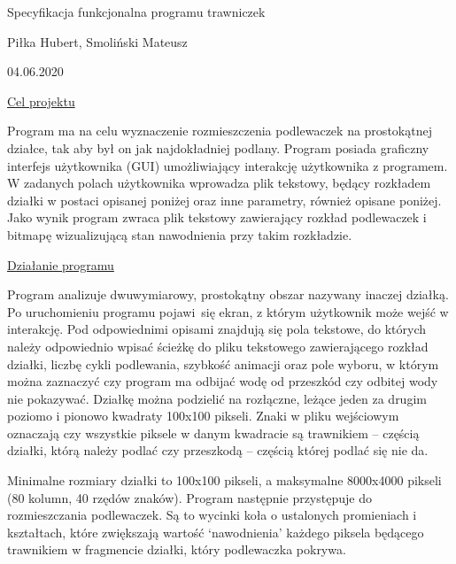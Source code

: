 \documentclass[12pt]{article}
\renewcommand{\_}{\kern-1.5pt\textunderscore\kern-1.5pt}
\begin{document}
\begin{Center}
Specyfikacja funkcjonalna programu trawniczek
\end{Center}\par

\begin{Center}
Piłka Hubert, Smoliński Mateusz
\end{Center}\par

\begin{Center}
04.06.2020
\end{Center}\par

{\fontsize{16pt}{19.2pt}\selectfont \uline{Cel projektu}\par}\par

Program ma na celu wyznaczenie rozmieszczenia podlewaczek na prostokątnej działce, tak aby był on jak najdokładniej podlany. Program posiada graficzny interfejs użytkownika (GUI) umożliwiający interakcję użytkownika z programem. W zadanych polach użytkownika wprowadza plik tekstowy, będący rozkładem działki w postaci opisanej poniżej oraz inne parametry, również opisane poniżej. Jako wynik program zwraca plik tekstowy zawierający rozkład podlewaczek i bitmapę wizualizującą stan nawodnienia przy takim rozkładzie.\par


\vspace{\baselineskip}
{\fontsize{16pt}{19.2pt}\selectfont \uline{Działanie programu}\par}\par

Program analizuje dwuwymiarowy, prostokątny obszar nazywany inaczej działką. Po uruchomieniu programu pojawi\ się ekran, z którym użytkownik może wejść w interakcję. Pod odpowiednimi opisami znajdują się pola tekstowe, do których należy odpowiednio wpisać ścieżkę do pliku tekstowego  zawierającego rozkład działki,  liczbę cykli podlewania, szybkość animacji oraz pole wyboru, w którym można zaznaczyć czy program ma odbijać wodę od przeszkód czy odbitej wody nie pokazywać. Działkę można podzielić na rozłączne, leżące jeden za drugim poziomo i pionowo kwadraty 100x100 pikseli. Znaki w pliku wejściowym oznaczają czy wszystkie piksele w danym kwadracie są trawnikiem – częścią działki, którą należy podlać czy przeszkodą – częścią której podlać się nie da. \par

Minimalne rozmiary działki to 100x100 pikseli, a maksymalne 8000x4000 pikseli (80 kolumn, 40 rzędów znaków). Program następnie przystępuje do rozmieszczania podlewaczek. Są to wycinki koła o ustalonych promieniach i kształtach, które zwiększają wartość ‘nawodnienia’ każdego piksela będącego trawnikiem w fragmencie działki, który podlewaczka pokrywa.\par
\end{document}
